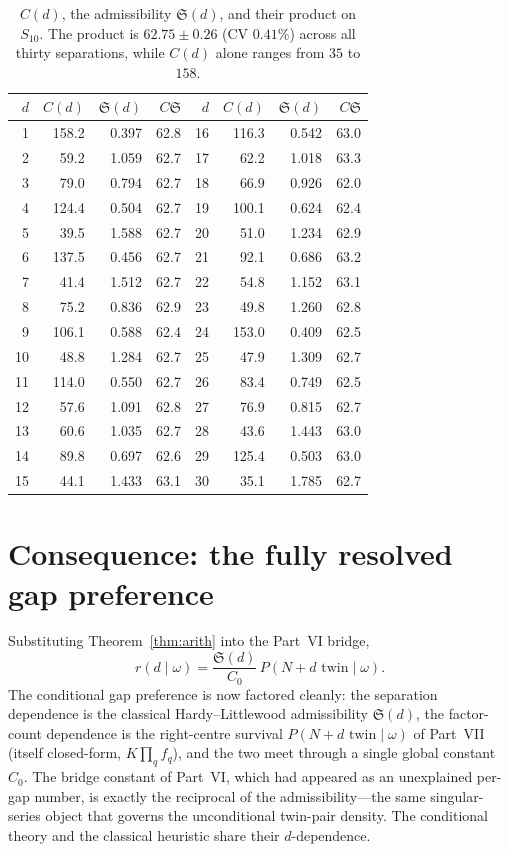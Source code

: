 \documentclass[11pt]{article}
\begin{document}
\begin{table}[h]\centering\small
\begin{tabular}{rrrr@{\hskip 2em}rrrr}
\toprule
$d$ & $C(d)$ & $\mathfrak{S}(d)$ & $C\mathfrak{S}$ &
$d$ & $C(d)$ & $\mathfrak{S}(d)$ & $C\mathfrak{S}$\\
\midrule
1 & 158.2 & 0.397 & 62.8 & 16 & 116.3 & 0.542 & 63.0\\
2 &  59.2 & 1.059 & 62.7 & 17 &  62.2 & 1.018 & 63.3\\
3 &  79.0 & 0.794 & 62.7 & 18 &  66.9 & 0.926 & 62.0\\
4 & 124.4 & 0.504 & 62.7 & 19 & 100.1 & 0.624 & 62.4\\
5 &  39.5 & 1.588 & 62.7 & 20 &  51.0 & 1.234 & 62.9\\
6 & 137.5 & 0.456 & 62.7 & 21 &  92.1 & 0.686 & 63.2\\
7 &  41.4 & 1.512 & 62.7 & 22 &  54.8 & 1.152 & 63.1\\
8 &  75.2 & 0.836 & 62.9 & 23 &  49.8 & 1.260 & 62.8\\
9 & 106.1 & 0.588 & 62.4 & 24 & 153.0 & 0.409 & 62.5\\
10 &  48.8 & 1.284 & 62.7 & 25 &  47.9 & 1.309 & 62.7\\
11 & 114.0 & 0.550 & 62.7 & 26 &  83.4 & 0.749 & 62.5\\
12 &  57.6 & 1.091 & 62.8 & 27 &  76.9 & 0.815 & 62.7\\
13 &  60.6 & 1.035 & 62.7 & 28 &  43.6 & 1.443 & 63.0\\
14 &  89.8 & 0.697 & 62.6 & 29 & 125.4 & 0.503 & 63.0\\
15 &  44.1 & 1.433 & 63.1 & 30 &  35.1 & 1.785 & 62.7\\
\bottomrule
\end{tabular}
\caption{$C(d)$, the admissibility $\mathfrak{S}(d)$, and their product on
$S_{10}$. The product is $62.75\pm0.26$ (CV $0.41\%$) across all thirty
separations, while $C(d)$ alone ranges from $35$ to $158$.}
\label{tab:arith}
\end{table}

\section{Consequence: the fully resolved gap preference}

Substituting Theorem~\ref{thm:arith} into the Part~VI bridge,
\[
  r(d\mid\omega)=\frac{\mathfrak{S}(d)}{C_0}\,P(N{+}d\text{ twin}\mid\omega).
\]
The conditional gap preference is now factored cleanly: the separation
dependence is the classical Hardy--Littlewood admissibility $\mathfrak{S}(d)$,
the factor-count dependence is the right-centre survival
$P(N{+}d\text{ twin}\mid\omega)$ of Part~VII (itself closed-form,
$K\prod_q f_q$), and the two meet through a single global constant $C_0$. The
bridge constant of Part~VI, which had appeared as an unexplained per-gap number,
is exactly the reciprocal of the admissibility---the same singular-series object
that governs the unconditional twin-pair density. The conditional theory and the
classical heuristic share their $d$-dependence.
\end{document}
